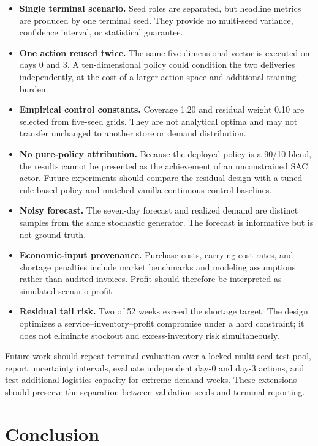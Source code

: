 \documentclass[pdflatex,sn-mathphys-num]{sn-jnl}
\begin{document}
\begin{itemize}
    \item \textbf{Single terminal scenario.} Seed roles are separated, but headline metrics are produced by one terminal seed. They provide no multi-seed variance, confidence interval, or statistical guarantee.
    \item \textbf{One action reused twice.} The same five-dimensional vector is executed on days 0 and 3. A ten-dimensional policy could condition the two deliveries independently, at the cost of a larger action space and additional training burden.
    \item \textbf{Empirical control constants.} Coverage 1.20 and residual weight 0.10 are selected from five-seed grids. They are not analytical optima and may not transfer unchanged to another store or demand distribution.
    \item \textbf{No pure-policy attribution.} Because the deployed policy is a 90/10 blend, the results cannot be presented as the achievement of an unconstrained SAC actor. Future experiments should compare the residual design with a tuned rule-based policy and matched vanilla continuous-control baselines.
    \item \textbf{Noisy forecast.} The seven-day forecast and realized demand are distinct samples from the same stochastic generator. The forecast is informative but is not ground truth.
    \item \textbf{Economic-input provenance.} Purchase costs, carrying-cost rates, and shortage penalties include market benchmarks and modeling assumptions rather than audited invoices. Profit should therefore be interpreted as simulated scenario profit.
    \item \textbf{Residual tail risk.} Two of 52 weeks exceed the shortage target. The design optimizes a service--inventory--profit compromise under a hard constraint; it does not eliminate stockout and excess-inventory risk simultaneously.
\end{itemize}

Future work should repeat terminal evaluation over a locked multi-seed test pool, report uncertainty intervals, evaluate independent day-0 and day-3 actions, and test additional logistics capacity for extreme demand weeks. These extensions should preserve the separation between validation seeds and terminal reporting.

\section{Conclusion}\label{sec:conclusion}
\end{document}
